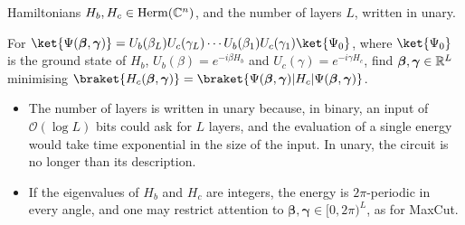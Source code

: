 \documentclass[handoutsbeamer.tex]{subfiles}
\begin{document}
\begin{frame}
\end{frame}

\begin{frame}
\onp{\footnotesize}
\begin{probl}\label{p:ch05:qaoa}
\begin{description}\setlength\itemsep{0.1em}
    \item[Instance] Hamiltonians $H_b,H_c\in\mathrm{Herm}(\mathbb{C}^n)$, and the number of layers $L$, written in unary.
    \item[Task] For $\ket{\Psi(\boldsymbol\beta,\boldsymbol\gamma)} = U_b(\beta_L)U_c(\gamma_L)\cdots U_b(\beta_1)U_c(\gamma_1)\ket{\Psi_0}$, where $\ket{\Psi_0}$ is the ground state of $H_b$, $U_b(\beta) = e^{-i\beta H_b}$ and $U_c(\gamma) = e^{-i\gamma H_c}$, find $\boldsymbol\beta,\boldsymbol\gamma\in\mathbb{R}^L$ minimising $\braket{H_c(\boldsymbol\beta,\boldsymbol\gamma)} = \braket{\Psi(\boldsymbol\beta,\boldsymbol\gamma)|H_c|\Psi(\boldsymbol\beta,\boldsymbol\gamma)}$.
\end{description}
\end{probl}
\begin{itemize}\setlength\itemsep{0.15em}
    \item The number of layers is written in unary because, in binary, an input of $\mathcal O(\log L)$ bits could ask for $L$ layers, and the evaluation of a single energy would take time exponential in the size of the input. In unary, the circuit is no longer than its description.
    \item If the eigenvalues of $H_b$ and $H_c$ are integers, the energy is $2\pi$-periodic in every angle, and one may restrict attention to $\boldsymbol\beta,\boldsymbol\gamma\in[0,2\pi)^L$, as for MaxCut.
\end{itemize}
\end{frame}
\end{document}
